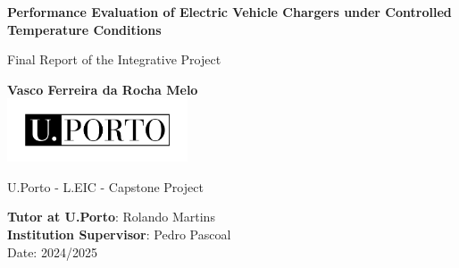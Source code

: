 \documentclass[10pt]{article}
\begin{document}
\begin{titlepage}
	\begin{center}
		\vspace*{1cm}
		
    {\fontsize{17}{30}\selectfont \textbf{Performance Evaluation of Electric Vehicle Chargers under Controlled Temperature Conditions}}
     
		
		\vspace{0.5cm}
		Final Report of the Integrative Project
		
		\vspace{1.5cm}
		
		\textbf{Vasco Ferreira da Rocha Melo}\\
		
		\vfill
		\includegraphics[width=0.4\textwidth]{UPORTO_fundotransparente}
		
		\vfill
		
	
		
		U.Porto - L.EIC - Capstone Project
		\vspace{0.8cm}
		
		\textbf{Tutor at U.Porto}: Rolando Martins\\
		\textbf{Institution Supervisor}: Pedro Pascoal\\

\vspace{0.4cm}
		Date: 2024/2025
		
	\end{center}
\end{titlepage}


\thispagestyle{empty} 
\clearpage

\thispagestyle{empty}
\renewcommand{\contentsname}{Contents}
\tableofcontents

 \clearpage


% 
\renewcommand{\figurename}{Figure}








\renewcommand{\refname}{Bibliography and References}

 

 
\end{document}
